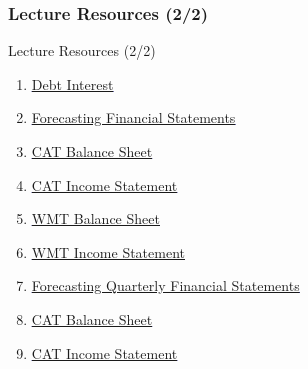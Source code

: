 \documentclass[handout, 11pt]{beamer}
\begin{document}
\begin{frame}
\frametitle{Lecture Resources (2/2)}
{
\begin{block}{Lecture Resources (2/2)}
\begin{enumerate}
\item \textcolor{blue}{\underline{\href{https://nickderobertis.github.io/fin-model-course/\_static/Materials for Lab Exercises/DCF/Forecasting/Simple/Debt Interest.xlsx}{Debt Interest}}}
\item \textcolor{blue}{\underline{\href{https://nickderobertis.github.io/fin-model-course/\_static/Examples/DCF/Forecasting/Simple/Forecasting Financial Statements.ipynb}{Forecasting Financial Statements}}}
\item \textcolor{blue}{\underline{\href{https://nickderobertis.github.io/fin-model-course/\_static/Examples/DCF/Forecasting/Simple/cat\_annual\_bs.csv}{CAT Balance Sheet}}}
\item \textcolor{blue}{\underline{\href{https://nickderobertis.github.io/fin-model-course/\_static/Examples/DCF/Forecasting/Simple/cat\_annual\_income.csv}{CAT Income Statement}}}
\item \textcolor{blue}{\underline{\href{https://nickderobertis.github.io/fin-model-course/\_static/Examples/DCF/Forecasting/Complex/WMT Balance Sheet.xlsx}{WMT Balance Sheet}}}
\item \textcolor{blue}{\underline{\href{https://nickderobertis.github.io/fin-model-course/\_static/Examples/DCF/Forecasting/Complex/WMT Balance Sheet.xlsx}{WMT Income Statement}}}
\item \textcolor{blue}{\underline{\href{https://nickderobertis.github.io/fin-model-course/\_static/Examples/DCF/Forecasting/Complex/Forecasting Quarterly Financial Statements.ipynb}{Forecasting Quarterly Financial Statements}}}
\item \textcolor{blue}{\underline{\href{https://nickderobertis.github.io/fin-model-course/\_static/Materials for Lab Exercises/DCF/Forecasting/Complex/CAT Balance Sheet.xlsx}{CAT Balance Sheet}}}
\item \textcolor{blue}{\underline{\href{https://nickderobertis.github.io/fin-model-course/\_static/Materials for Lab Exercises/DCF/Forecasting/Complex/CAT Income Statement.xlsx}{CAT Income Statement}}}
\end{enumerate}
\vfill
\end{block}
}
\label{frames:resources}
\end{frame}
\end{document}
